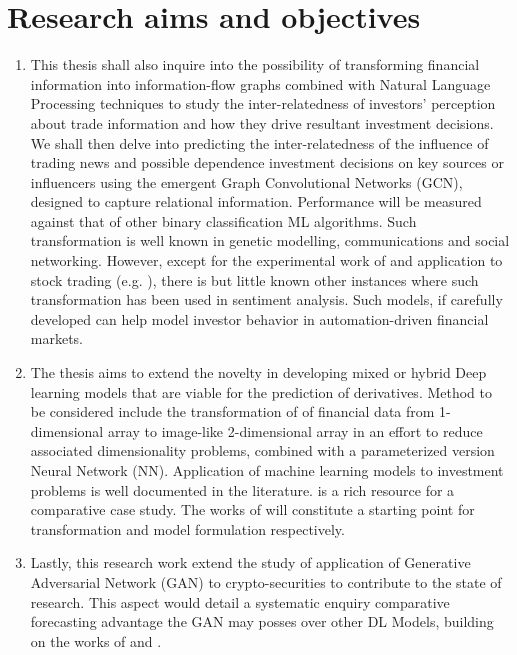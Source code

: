 \documentclass[a4paper,11pt]{scrartcl}
\begin{document}
\section{Research aims and objectives}
\begin{enumerate}
    \item This thesis shall also inquire into the possibility of transforming financial information into information-flow graphs combined with Natural Language Processing techniques to study the inter-relatedness of investors' perception about trade information and how they drive resultant investment decisions. We shall then delve into predicting the inter-relatedness of the influence of trading news and possible dependence investment decisions on key sources or influencers using the emergent  Graph Convolutional Networks (GCN), designed to capture relational information. Performance will be  measured against that of other binary classification ML algorithms.
          Such transformation is well known in genetic modelling, communications and social networking. However, except for the experimental work of  \cite{weber2019anti} and application to stock trading (e.g. \cite{chen2018incorporating,wang2019alphastock}), there is but little known other instances where such transformation has been used in sentiment analysis. Such models, if carefully developed can help model investor behavior in automation-driven financial markets. \label{obj_1}
    \item The thesis aims to extend the novelty in developing mixed or hybrid Deep learning models that are viable for the prediction of derivatives. Method to be considered include the transformation of of financial data from 1-dimensional array to image-like 2-dimensional array in an effort to reduce associated dimensionality problems, combined with a parameterized version Neural Network (NN). Application of machine learning models to investment problems is well documented in the literature. \cite{ozbayoglu2020deep} is a rich resource for a comparative case study. The works of \cite{culkin2017machine, sezer2020financial} will constitute a starting point for transformation and model formulation respectively. \label{obj_2}
    \item Lastly, this research work extend the study of application of Generative Adversarial Network (GAN) to crypto-securities to contribute to the state of research. This aspect would detail a systematic enquiry comparative forecasting advantage the GAN may posses over other DL Models, building on the works of \cite{zola2020generative} and \cite{grilli2020generative}. \label{obj_3}
\end{enumerate}
\end{document}
